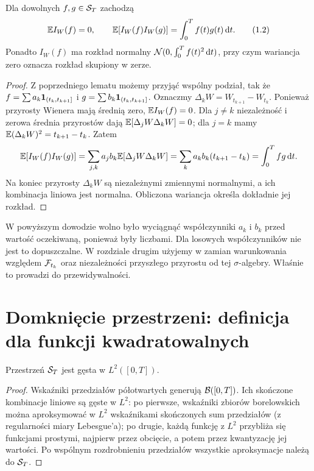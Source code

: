 \begin{twierdzenie}\label{th:wiener-isometry}
Dla dowolnych $f,g\in\mathcal{S}_T$ zachodzą
\[
\mathbb{E} I_W(f)=0,\qquad
\mathbb{E}[I_W(f)I_W(g)]=\int_0^T f(t)g(t)\,\mathrm{d} t.
\tag{1.2}\label{eq:wienscalar}
\]
Ponadto $I_W(f)$ ma rozkład normalny
$\mathcal{N}(0,\int_0^Tf(t)^2\,\mathrm{d} t)$,
przy czym wariancja zero oznacza rozkład skupiony w zerze.
\end{twierdzenie}
\begin{proof}
Z poprzedniego lematu możemy przyjąć wspólny podział,
tak że $f=\sum a_k\mathbf{1}_{(t_k,t_{k+1}]}$ i
$g=\sum b_k\mathbf{1}_{(t_k,t_{k+1}]}$. Oznaczmy
$\Delta_kW=W_{t_{k+1}}-W_{t_k}$. Ponieważ przyrosty Wienera
mają średnią zero, $\mathbb{E} I_W(f)=0$. Dla $j\ne k$
niezależność i zerowa średnia przyrostów dają
$\mathbb{E}[\Delta_jW\Delta_kW]=0$; dla $j=k$ mamy
$\mathbb{E}(\Delta_kW)^2=t_{k+1}-t_k$. Zatem
\[
\mathbb{E}[I_W(f)I_W(g)]
=\sum_{j,k}a_jb_k\mathbb{E}[\Delta_jW\Delta_kW]
=\sum_k a_kb_k(t_{k+1}-t_k)
=\int_0^Tfg\,\mathrm{d} t.
\]
Na koniec przyrosty $\Delta_kW$ są niezależnymi zmiennymi
normalnymi, a ich kombinacja liniowa jest normalna.
Obliczona wariancja określa dokładnie jej rozkład.
\end{proof}

\begin{uwaga}
W powyższym dowodzie wolno było wyciągnąć współczynniki
$a_k$ i $b_k$ przed wartość oczekiwaną, ponieważ były liczbami.
Dla losowych współczynników nie jest to dopuszczalne.
W rozdziale drugim użyjemy w zamian warunkowania względem
$\mathcal{F}_{t_k}$ oraz niezależności przyszłego przyrostu od tej
$\sigma$-algebry. Właśnie to prowadzi do przewidywalności.
\end{uwaga}

\section{Domknięcie przestrzeni: definicja dla funkcji kwadratowalnych}
\begin{lemat}
Przestrzeń $\mathcal{S}_T$ jest gęsta w $L^2([0,T])$.
\end{lemat}
\begin{proof}
Wskaźniki przedziałów półotwartych generują $\mathcal{B}([0,T])$.
Ich skończone kombinacje liniowe są gęste w $L^2$:
po pierwsze, wskaźniki zbiorów borelowskich można
aproksymować w $L^2$ wskaźnikami skończonych sum przedziałów
(z regularności miary Lebesgue'a); po drugie,
każdą funkcję z $L^2$ przybliża się funkcjami prostymi,
najpierw przez obcięcie, a potem przez kwantyzację jej wartości.
Po wspólnym rozdrobnieniu przedziałów wszystkie aproksymacje
należą do $\mathcal{S}_T$.
\end{proof}


